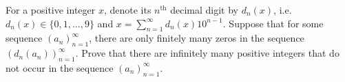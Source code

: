 For a positive integer \(x\), denote its \(n^{\mathrm{th}}\) decimal digit by \(d_n(x)\), i.e. \(d_n(x)\in \{ 0,1, \dots, 9\}\) and \(x=\sum_{n=1}^{\infty} d_n(x)10^{n-1}\). Suppose that for some sequence \((a_n)_{n=1}^{\infty}\), there are only finitely many zeros in the sequence \((d_n(a_n))_{n=1}^{\infty}\). Prove that there are infinitely many positive integers that do not occur in the sequence \((a_n)_{n=1}^{\infty}\).